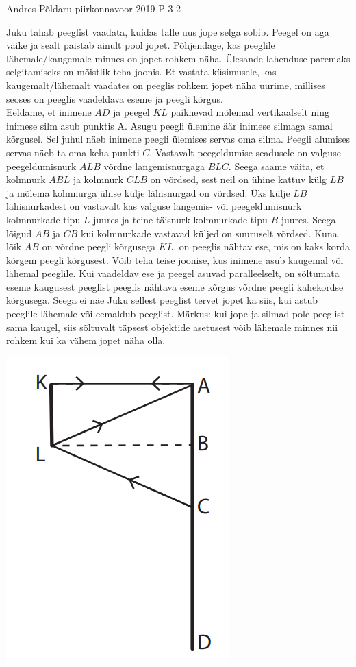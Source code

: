 {Andres Põldaru} %
{piirkonnavoor} %
{2019} %
{P 3} %
{2} %
{
\ifStatement
Juku tahab peeglist vaadata, kuidas talle uus jope selga sobib. Peegel on aga väike ja sealt paistab ainult pool jopet. Põhjendage, kas peeglile lähemale/kaugemale minnes on jopet rohkem näha. 
\fi
\ifHint
Ülesande lahenduse paremaks selgitamiseks on mõistlik teha joonis.
\fi
\ifSolution
Et vastata küsimusele, kas kaugemalt/lähemalt vaadates on peeglis rohkem jopet näha uurime, millises seoses on peeglis vaadeldava eseme ja peegli kõrgus. \\
Eeldame, et inimene $AD$ ja peegel $KL$ paiknevad mõlemad vertikaalselt ning inimese silm asub punktis A. 
Asugu peegli ülemine äär inimese silmaga samal kõrgusel. Sel juhul näeb inimene peegli ülemises servas oma silma. Peegli alumises servas näeb ta oma keha punkti $C$. 
Vastavalt peegeldumise seadusele on valguse peegeldumisnurk $ALB$ võrdne langemisnurgaga $BLC$. 
Seega saame väita, et kolmnurk $ABL$ ja kolmnurk $CLB$ on võrdsed, sest neil on ühine kattuv külg $LB$ ja mõlema kolmnurga ühise külje lähisnurgad on võrdsed. Üks külje $LB$ lähisnurkadest on vastavalt kas valguse langemis- või peegeldumisnurk kolmnurkade tipu $L$ juures ja teine täisnurk kolmnurkade tipu $B$ juures. 
Seega lõigud $AB$ ja $CB$ kui kolmnurkade vastavad küljed on suuruselt võrdsed. 
Kuna lõik $AB$ on võrdne peegli kõrgusega $KL$, on peeglis nähtav ese, mis on kaks korda kõrgem peegli kõrgusest.
Võib teha teise joonise, kus inimene asub kaugemal või lähemal peeglile. Kui vaadeldav ese ja peegel asuvad paralleelselt, on sõltumata eseme kaugusest peeglist peeglis nähtava eseme kõrgus võrdne peegli kahekordse kõrgusega. Seega ei näe Juku sellest peeglist tervet jopet ka siis, kui astub peeglile lähemale või eemaldub peeglist. 
Märkus: kui jope ja silmad pole peeglist sama kaugel, siis sõltuvalt täpsest objektide asetusest võib lähemale minnes nii rohkem kui ka vähem jopet näha olla.
\begin{center}
	\includegraphics[width=0.5\linewidth]{2019-v2p-03-lah.PNG}
\end{center}
\fi
}
